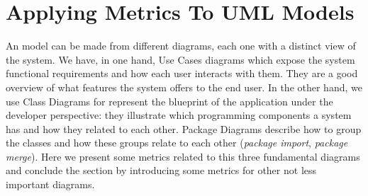 \section{Applying Metrics To UML Models}\label{metrics}

An \umlS model can be made from different diagrams, each one with a distinct view of the system.
We have, in one hand, Use Cases diagrams which expose the system functional requirements and how each user interacts with them. They are a good overview of what features the system offers to the end user.
In the other hand, we use Class Diagrams for represent the blueprint of the application under the developer perspective: they illustrate which programming components a system has and how they related to each other.
Package Diagrams describe how to group the classes and how these groups relate to each other (\textit{package import}, \textit{package merge}).
Here we present some metrics related to this three fundamental diagrams and conclude the section by introducing some metrics for other not less important \umlS diagrams.

